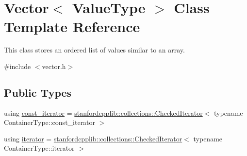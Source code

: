 \hypertarget{classVector}{}\section{Vector$<$ Value\+Type $>$ Class Template Reference}
\label{classVector}


This class stores an ordered list of values similar to an array.  




{\ttfamily \#include $<$vector.\+h$>$}

\subsection*{Public Types}
\begin{DoxyCompactItemize}
\item 
using \mbox{\hyperlink{classVector_aa1fbc80673e1a5d9661a77e20836b8d8}{const\+\_\+iterator}} = \mbox{\hyperlink{classstanfordcpplib_1_1collections_1_1CheckedIterator}{stanfordcpplib\+::collections\+::\+Checked\+Iterator}}$<$ typename Container\+Type\+::const\+\_\+iterator $>$
\item 
using \mbox{\hyperlink{classVector_aa8cbadd6807ea71ae7465ef4793a6866}{iterator}} = \mbox{\hyperlink{classstanfordcpplib_1_1collections_1_1CheckedIterator}{stanfordcpplib\+::collections\+::\+Checked\+Iterator}}$<$ typename Container\+Type\+::iterator $>$
\end{DoxyCompactItemize}
